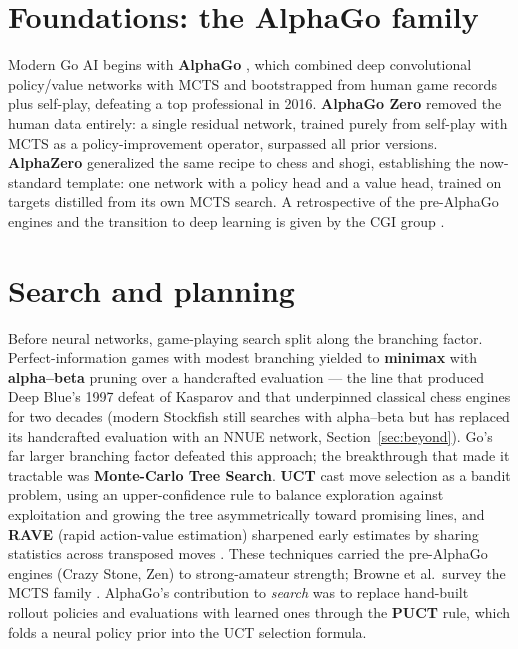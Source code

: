 \documentclass[11pt]{article}
\begin{document}
\section{Foundations: the AlphaGo family}
Modern Go AI begins with \textbf{AlphaGo} \cite{alphago2016}, which combined deep
convolutional policy/value networks with MCTS and bootstrapped from human game records
plus self-play, defeating a top professional in 2016. \textbf{AlphaGo Zero}
\cite{alphagozero2017} removed the human data entirely: a single residual network,
trained purely from self-play with MCTS as a policy-improvement operator, surpassed all
prior versions. \textbf{AlphaZero} \cite{alphazero2018} generalized the same recipe to
chess and shogi, establishing the now-standard template: one network with a policy head
and a value head, trained on targets distilled from its own MCTS search. A retrospective
of the pre-AlphaGo engines and the transition to deep learning is given by the CGI
group \cite{cgisurvey2016}.

\section{Search and planning}
\label{sec:search}
Before neural networks, game-playing search split along the branching factor.
Perfect-information games with modest branching yielded to \textbf{minimax} with
\textbf{alpha--beta} pruning over a handcrafted evaluation --- the line that produced
Deep Blue's 1997 defeat of Kasparov \cite{deepblue2002} and that underpinned classical chess
engines for two decades (modern Stockfish still searches with alpha--beta but has replaced
its handcrafted evaluation with an NNUE network, Section~\ref{sec:beyond}). Go's far larger branching factor defeated this approach; the breakthrough
that made it tractable was \textbf{Monte-Carlo Tree Search}. \textbf{UCT} \cite{uct2006}
cast move selection as a bandit problem, using an upper-confidence rule to balance
exploration against exploitation and growing the tree asymmetrically toward promising lines,
and \textbf{RAVE} (rapid action-value estimation) sharpened early estimates by sharing
statistics across transposed moves \cite{rave2007}. These techniques carried the pre-AlphaGo
engines (Crazy Stone, Zen) to strong-amateur strength; Browne et al.\ survey the MCTS family
\cite{mctssurvey2012}. AlphaGo's contribution to \emph{search} was to replace hand-built
rollout policies and evaluations with learned ones through the \textbf{PUCT} rule, which
folds a neural policy prior into the UCT selection formula.
\end{document}
